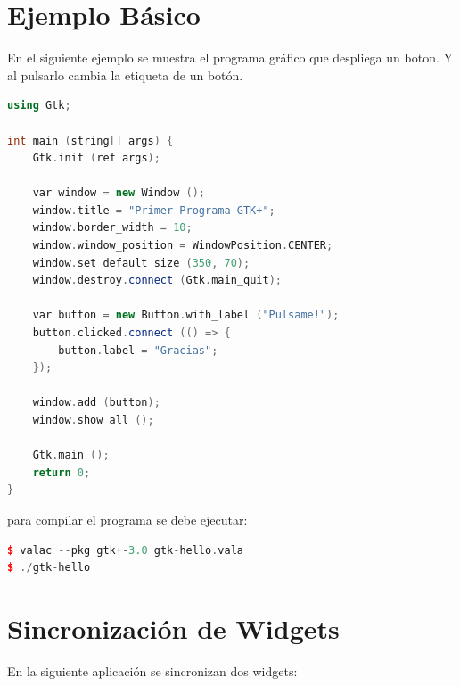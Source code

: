 \documentclass[12pt,twoside]{book}
\begin{document}
\section{Ejemplo Básico}

En el siguiente ejemplo se muestra el programa gráfico que despliega un boton. Y al pulsarlo cambia la etiqueta de un botón.

\begin{lstlisting}[language=C++]
using Gtk;

int main (string[] args) {
    Gtk.init (ref args);

    var window = new Window ();
    window.title = "Primer Programa GTK+";
    window.border_width = 10;
    window.window_position = WindowPosition.CENTER;
    window.set_default_size (350, 70);
    window.destroy.connect (Gtk.main_quit);

    var button = new Button.with_label ("Pulsame!");
    button.clicked.connect (() => {
        button.label = "Gracias";
    });

    window.add (button);
    window.show_all ();

    Gtk.main ();
    return 0;
}

\end{lstlisting}

para compilar el programa se debe ejecutar:

\begin{lstlisting}[language=C++]
$ valac --pkg gtk+-3.0 gtk-hello.vala
$ ./gtk-hello
\end{lstlisting}

\section{Sincronización de Widgets}

En la siguiente aplicación se sincronizan dos widgets:
\end{document}
